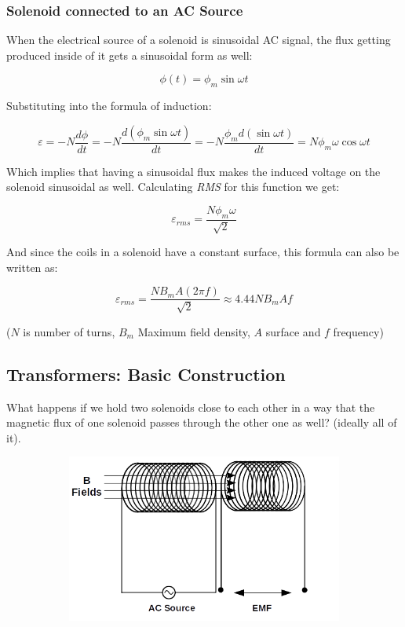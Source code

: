 \documentclass{article}
\begin{document}
	\subsubsection{Solenoid connected to an AC Source}	
	When the electrical source of a solenoid is sinusoidal AC signal, the flux getting produced inside of it gets a sinusoidal form as well:
	
	$$ \phi(t) = \phi_{m} \sin \omega t $$
	
	Substituting into the formula of induction:
	
	$$ \varepsilon = -N \frac{d\phi}{dt} = - N \frac{d (\phi_{m} \sin \omega t)}{dt} = -N \frac{\phi_{m} d (\sin \omega t)}{dt} = N \phi_{m} \omega \cos \omega t $$
	
	Which implies that having a sinusoidal flux makes the induced voltage on the solenoid sinusoidal as well.
	Calculating \textit{RMS} for this function we get:
	
	$$ \varepsilon_{rms} = \frac{N \phi_{m} \omega}{\sqrt{2}}$$
	
	And since the coils in a solenoid have a constant surface, this formula can also be written as:
	
	$$ \varepsilon_{rms} = \frac{N B_{m} A (2\pi f)}{\sqrt{2}} \approx 4.44NB_{m}Af $$
	
	($N$ is number of turns, $B_m$ Maximum field density, $A$ surface and $f$ frequency)
		
	\subsection{Transformers: Basic Construction}
	
	What happens if we hold two solenoids close to each other in a way that the magnetic flux of one solenoid passes through the other one as well? (ideally all of it).
	
	\begin{figure}[h!]
	\centering
	\begin{subfigure}[b]{0.9\linewidth}
		\includegraphics[width=\linewidth]{basic_transformer.png}
	\end{subfigure}
	\end{figure}
	
\end{document}
